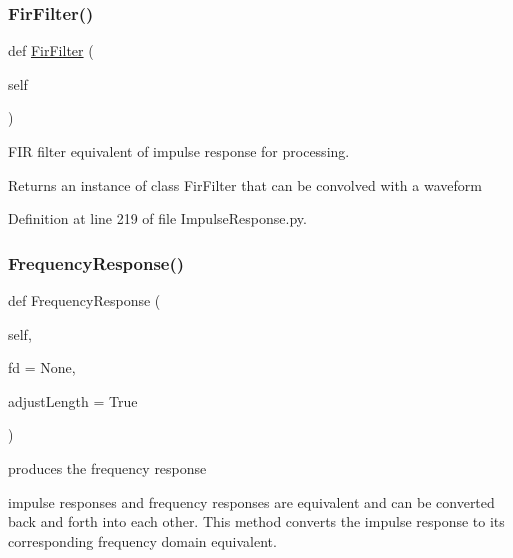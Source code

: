 \subsubsection{\texorpdfstring{Fir\+Filter()}{FirFilter()}}
{\footnotesize\ttfamily def \hyperlink{classSignalIntegrity_1_1TimeDomain_1_1Filters_1_1FirFilter_1_1FirFilter}{Fir\+Filter} (\begin{DoxyParamCaption}\item[{}]{self }\end{DoxyParamCaption})}



F\+IR filter equivalent of impulse response for processing. 

\begin{DoxyReturn}{Returns}
an instance of class Fir\+Filter that can be convolved with a waveform 
\end{DoxyReturn}


Definition at line 219 of file Impulse\+Response.\+py.

\mbox{\label{classSignalIntegrity_1_1TimeDomain_1_1Waveform_1_1ImpulseResponse_1_1ImpulseResponse_a8a375a8188c5b58fa6f933db5737ddd1}} 
\subsubsection{\texorpdfstring{Frequency\+Response()}{FrequencyResponse()}}
{\footnotesize\ttfamily def Frequency\+Response (\begin{DoxyParamCaption}\item[{}]{self,  }\item[{}]{fd = {\ttfamily None},  }\item[{}]{adjust\+Length = {\ttfamily True} }\end{DoxyParamCaption})}



produces the frequency response 

impulse responses and frequency responses are equivalent and can be converted back and forth into each other. This method converts the impulse response to its corresponding frequency domain equivalent.

